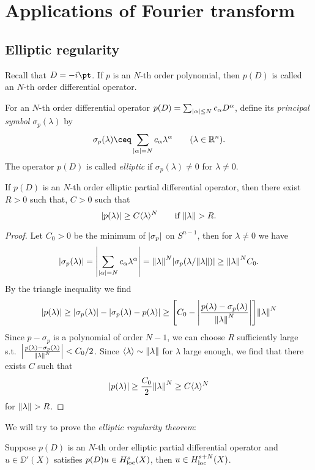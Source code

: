 \section{Applications of Fourier transform}
\subsection{Elliptic regularity}
Recall that $D = -i\pt$. If $p$ is an $N$-th order polynomial, then $p(D)$ is called an $N$-th order differential operator. 

\begin{definition}
	For an $N$-th order differential operator $p(D) = \sum_{\abs{\alpha} \leq N} c_\alpha D^\alpha$, define its \emph{principal symbol} $\sigma_p(\lambda)$ by \[
	\sigma_p(\lambda) \ceq \sum_{\abs{\alpha} = N} c_\alpha \lambda^\alpha \qquad(\lambda \in \RR^n). 
	\]
	The operator $p(D)$ is called \emph{elliptic} if $\sigma_p(\lambda) \neq 0$ for $\lambda \neq 0$. 
\end{definition}

\begin{lemma}
	If $p(D)$ is an $N$-th order elliptic partial differential operator, then there exist $R > 0$ such that, $C > 0$ such that 
	\[
	\abs{p(\lambda)} \geq C \langle\lambda\rangle^N \qquad\text{if } \norm{\lambda} > R. 
	\]
\end{lemma}

\begin{proof}
Let $C_0 > 0$ be the minimum of $\abs{\sigma_p}$ on $S^{n-1}$, then for $\lambda \neq 0$ we have
\[
\abs{\sigma_p(\lambda)} = \abs{\sum_{\abs{\alpha} = N} c_\alpha \lambda^\alpha} = \norm{\lambda}^N \abs{\sigma_p(\lambda/\norm{\lambda})}  \geq \norm{\lambda}^N C_0. 
\]
By the triangle inequality we find
\[
\abs{p(\lambda)} \geq \abs{\sigma_p(\lambda)} - \abs{\sigma_p(\lambda) - p(\lambda)} \geq \qty[ C_0 - \abs{\frac{p(\lambda) - \sigma_p(\lambda)}{\norm{\lambda}^N}}] \norm{\lambda}^N
\]
Since $p - \sigma_p$ is a polynomial of order $N - 1$, we can choose $R$ sufficiently large s.t.\ $\abs{\frac{p(\lambda) - \sigma_p(\lambda)}{\norm{\lambda}^N}} < C_0/2$. Since $\langle\lambda\rangle \sim \norm{\lambda}$ for $\lambda$ large enough, we find that there exists $C$ such that
\[
\abs{p(\lambda)} \geq \frac{C_0}{2} \norm{\lambda}^N \geq C \langle\lambda\rangle^N
\]
for $\norm{\lambda} > R$. 
\end{proof}

We will try to prove the \emph{elliptic regularity theorem}:
\begin{theorem} \label{thm:elliptic_regularity}
	Suppose $p(D)$ is an $N$-th order elliptic partial differential operator and $u \in \DD'(X)$ satisfies $p(D) u \in H^s_\mathrm{loc}(X)$, then $u \in H^{s+N}_\mathrm{loc}(X)$. 
\end{theorem}

